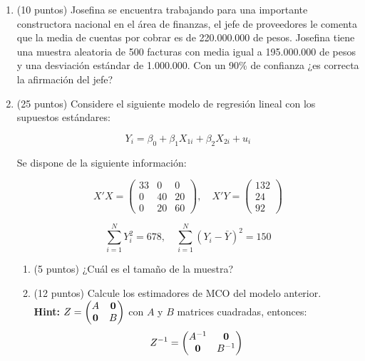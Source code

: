 \documentclass[10pt,a4paper]{article}
\begin{document}
\begin{enumerate}

\item  (10 puntos) Josefina se encuentra trabajando para una importante constructora nacional en el \'area de finanzas, el jefe de
proveedores le comenta que la media de cuentas por cobrar es de 220.000.000 de pesos. Josefina tiene una  muestra aleatoria de 500 facturas con media igual a 195.000.000 de pesos y una desviaci\'on
est\'andar de 1.000.000. Con un 90\% de confianza ¿es correcta la afirmación del jefe?








    \item (25 puntos) Considere el siguiente modelo de regresión lineal con los supuestos estándares:

    \[
    Y_i = \beta_0 + \beta_1 X_{1i} + \beta_2 X_{2i} + u_i
    \]
    
    Se dispone de la siguiente información:
    
    \[
    X'X = \begin{pmatrix}
    33 & 0 & 0 \\
    0 & 40 & 20 \\
    0 & 20 & 60
    \end{pmatrix}, \quad
    X'Y = \begin{pmatrix}
    132 \\
    24 \\
    92
    \end{pmatrix}
    \]
    
    \[
    \sum_{i=1}^{N} Y_i^2 = 678, \quad \sum_{i=1}^{N} (Y_i - \bar{Y})^2 = 150
    \]

    \begin{enumerate}
        \item (5 puntos) ¿Cuál es el tamaño de la muestra?\\
    
        \item (12 puntos) Calcule los estimadores de MCO del modelo anterior.\\
        \textbf{Hint:} \( Z = \begin{pmatrix} A &{\bf 0} \\ {\bf 0} & B \end{pmatrix} \) con \( A \) y \( B \) matrices cuadradas, entonces:\[Z^{-1} = \begin{pmatrix} A^{-1} & {\bf 0} \\{\bf 0} & B^{-1} \end{pmatrix}\]


\end{enumerate}
\end{enumerate}
\end{document}
